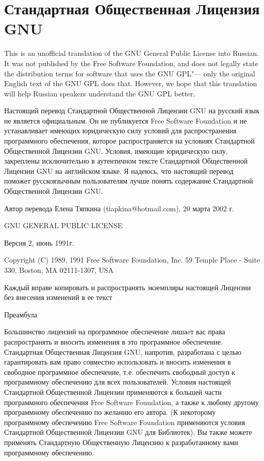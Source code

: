 \chapter{Стандартная Общественная Лицензия GNU}\label{gpl_appendix_ru}

\begin{small}
This is an unofficial translation of the GNU General Public License into
Russian. It was not published by the Free Software Foundation, and does
not legally state the distribution terms for software that uses the GNU
GPL"--- only the original English text of the GNU GPL does that. However,
we hope that this translation will help Russian speakers understand the
GNU GPL better.

Настоящий перевод Стандартной Общественной Лицензии GNU на русский язык
не является официальным. Он не публикуется Free Software Foundation и не
устанавливает имеющих юридическую силу условий для распространения
программного обеспечения, которое распространяется на условиях Стандартной
Общественной Лицензии GNU. Условия, имеющие юридическую силу, закреплены
исключительно в аутентичном тексте Стандартной Общественной Лицензии GNU
на английском языке. Я надеюсь, что настоящий перевод поможет
русскоязычным пользователям лучше понять содержание Стандартной
Общественной Лицензии GNU.

Автор перевода Елена Тяпкина (tiapkina@hotmail.com), 20 марта 2002 г.


\begin{center}
GNU GENERAL PUBLIC LICENSE

Версия 2, июнь 1991г.


Copyright (C) 1989, 1991 Free Software Foundation, Inc.
59 Temple Place - Suite 330, Boston, MA  02111-1307, USA


Каждый вправе копировать и распространять экземпляры настоящей Лицензии
без внесения изменений в ее текст
\end{center}
Преамбула

Большинство лицензий на программное обеспечение лишаeт вас права
распространять и вносить изменения в это программное обеспечение.
Стандартная Общественная Лицензия GNU, напротив, разработана с целью
гарантировать вам право совместно использовать и вносить изменения в
свободное программное обеспечение, т.е. обеспечить свободный доступ к
программному обеспечению для всех пользователей. Условия настоящей
Стандартной Общественной Лицензии применяются к большей части
программного обеспечения Free Software Foundation, а также к любому
другому программному обеспечению по желанию его автора. (К некоторому
программному обеспечению Free Software Foundation применяются условия
Стандартной Общественной Лицензии GNU для Библиотек). Вы также можете
применять Стандартную Общественную Лицензию к разработанному вами
программному обеспечению.


\end{small}
